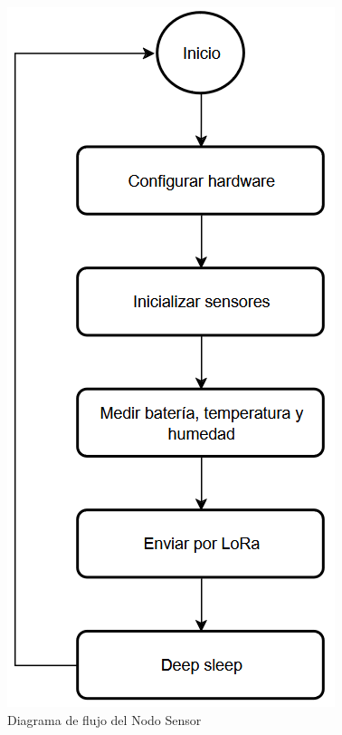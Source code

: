 \begin{figure}[H]
    \centering
    \includegraphics[width=0.5\linewidth]{Figures/Firmware/flujo_medidor.png}
    \caption{Diagrama de flujo del Nodo Sensor}
    \label{fig:diagrama-flujo-sensor}
\end{figure}


